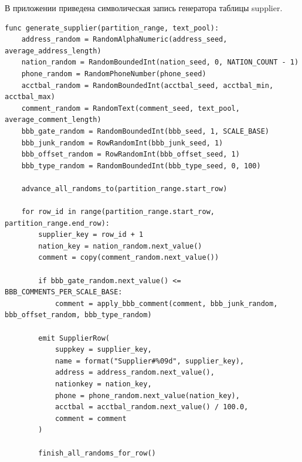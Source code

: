 \setcounter{appendixlstbase}{\value{lstlisting}}
\renewcommand{\thelstlisting}{\Asbuk{appendicesnum}.\number\numexpr\value{lstlisting}-\value{appendixlstbase}\relax}
\label{appendix:supplier}

В приложении приведена символическая запись генератора таблицы
supplier.

\begin{lstlisting}[style=reportpseudocode,caption={Формирование таблицы supplier},label={lst:app-supplier}]
func generate_supplier(partition_range, text_pool):
    address_random = RandomAlphaNumeric(address_seed, average_address_length)
    nation_random = RandomBoundedInt(nation_seed, 0, NATION_COUNT - 1)
    phone_random = RandomPhoneNumber(phone_seed)
    acctbal_random = RandomBoundedInt(acctbal_seed, acctbal_min, acctbal_max)
    comment_random = RandomText(comment_seed, text_pool, average_comment_length)
    bbb_gate_random = RandomBoundedInt(bbb_seed, 1, SCALE_BASE)
    bbb_junk_random = RowRandomInt(bbb_junk_seed, 1)
    bbb_offset_random = RowRandomInt(bbb_offset_seed, 1)
    bbb_type_random = RandomBoundedInt(bbb_type_seed, 0, 100)

    advance_all_randoms_to(partition_range.start_row)

    for row_id in range(partition_range.start_row, partition_range.end_row):
        supplier_key = row_id + 1
        nation_key = nation_random.next_value()
        comment = copy(comment_random.next_value())

        if bbb_gate_random.next_value() <= BBB_COMMENTS_PER_SCALE_BASE:
            comment = apply_bbb_comment(comment, bbb_junk_random, bbb_offset_random, bbb_type_random)

        emit SupplierRow(
            suppkey = supplier_key,
            name = format("Supplier#%09d", supplier_key),
            address = address_random.next_value(),
            nationkey = nation_key,
            phone = phone_random.next_value(nation_key),
            acctbal = acctbal_random.next_value() / 100.0,
            comment = comment
        )

        finish_all_randoms_for_row()
\end{lstlisting}
